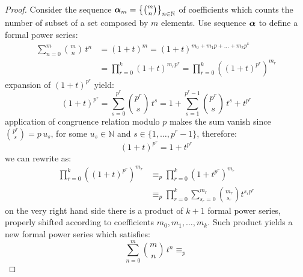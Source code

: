 \begin{proof}
    Consider the sequence $\boldsymbol{\alpha}_{m}=\left\lbrace{{m}\choose{n}}\right\rbrace_{n\in\mathbb{N}}$ 
    of coefficients which counts the number of subset
    of a set composed by $m$ elements. Use sequence $\boldsymbol{\alpha}$ to define a formal power series:
    \begin{displaymath}
        \begin{split}
            \sum_{n=0}^{m}{{{m}\choose{n}}\,t^{n}} &= \left(1+t\right)^{m}
                = \left(1+t\right)^{m_{0}+m_{1}p+\ldots+m_{k}p^{k}}\\
                &= \prod_{r=0}^{k}{{\left(1+t\right)^{m_{r}p^{r}}}}
                = \prod_{r=0}^{k}{\left(\left(1+t\right)^{p^{r}}\right)^{m_{r}}}
        \end{split}
    \end{displaymath}
    expansion of $\left(1+t\right)^{p^{r}}$ yield: 
    \begin{displaymath}
            \left(1+t\right)^{p^{r}} = \sum_{s=0}^{p^{r}}{{{p^{r}}\choose{s}}\,t^{s}}
                = 1+\sum_{s=1}^{p^{r}-1}{{{p^{r}}\choose{s}}\,t^{s}}+t^{p^{r}}
    \end{displaymath}
    application of congruence relation modulo $p$ makes the sum vanish since ${{p^{r}}\choose{s}}=p\,u_{s}$,
    for some $u_{s}\in\mathbb{N}$ and $s\in\lbrace 1,\ldots,p^{r}-1\rbrace$, therefore:
    \begin{displaymath}
        \left(1+t\right)^{p^{r}} = 1+t^{p^{r}}
    \end{displaymath}
    we can rewrite as:
    \begin{displaymath}
        \begin{split}
            \prod_{r=0}^{k}{\left(\left(1+t\right)^{p^{r}}\right)^{m_{r}}}
                &\equiv_{p} \prod_{r=0}^{k}{\left(1+t^{p^{r}}\right)^{m_{r}}}\\
                &\equiv_{p} \prod_{r=0}^{k}{\sum_{s_{r}=0}^{m_{r}}{{{m_{r}}\choose{s_{r}}}t^{s_{r}p^{r}}}}
        \end{split}
    \end{displaymath}
    on the very right hand side there is a product of $k+1$ formal power series, properly shifted according to coefficients
    $m_{0},m_{1},\ldots,m_{k}$. Such product yields a new formal power series which satisfies:
    \begin{displaymath}
        \sum_{n=0}^{m}{{{m}\choose{n}}\,t^{n}} 
        \equiv_{p}

\end{displaymath}
\end{proof}
